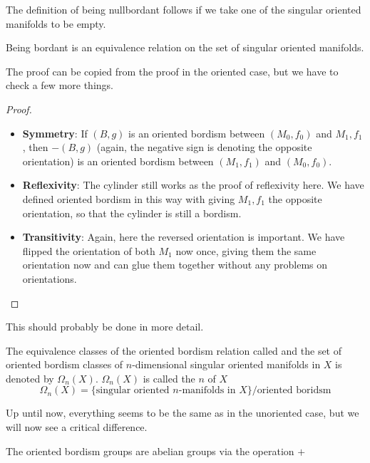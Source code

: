 \documentclass[a4paper,11pt]{article}
\begin{document}
\begin{remark}
    The definition of being nullbordant follows if we take one of the singular oriented manifolds to be empty.
\end{remark}

\begin{proposition}\label{oriented eq. rel}
    Being bordant is an equivalence relation on the set of singular oriented manifolds.
\end{proposition}

The proof can be copied from the proof in the oriented case, but we have to check a few more things.

\begin{proof}
    \begin{itemize}
        \item \textbf{Symmetry}: If \((B,g)\) is an oriented bordism between \((M_0,f_0)\) and \(M_1,f_1\), then \(-(B,g)\) (again, the negative sign is denoting the opposite orientation) is an oriented bordism between \((M_1,f_1)\) and \((M_0,f_0)\).
        \item \textbf{Reflexivity}: The cylinder still works as the proof of reflexivity here. We have defined oriented bordism in this way with giving \(M_1,f_1\) the opposite orientation, so that the cylinder is still a bordism.
        \item \textbf{Transitivity}: Again, here the reversed orientation is important. We have flipped the orientation of both \(M_1\) now once, giving them the same orientation now and can glue them together without any problems on orientations.
    \end{itemize}
\end{proof}
This should probably be done in more detail.

\begin{definition}
    The equivalence classes of the oriented bordism relation called  and the set of oriented bordism classes of \(n\)-dimensional singular oriented manifolds in \(X\) is denoted by \(\Omega_n(X)\). \(\Omega_n(X)\) is called the \(n\) of \(X\)
    \[\Omega_n(X)=\{\text{singular oriented \(n\)-manifolds in } X\}\big/\text{oriented boridsm}\]
\end{definition}

Up until now, everything seems to be the same as in the unoriented case, but we will now see a critical difference.

\begin{theorem}
    The oriented bordism groups are abelian groups via the operation \(+\)
\end{theorem}
\end{document}
